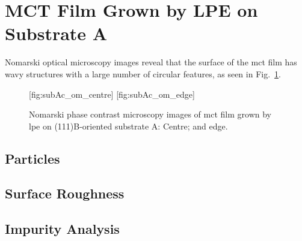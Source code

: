 \clearpage
\section{MCT Film Grown by LPE on Substrate A}\label{sec:subAc}

Nomarski optical microscopy images reveal that the surface of the \ac{mct} film has wavy structures with a large number of circular features, as seen in Fig.~\ref{fig:subAc_om}.

\begin{figure}[htbp]
    \centering
    [fig:subAc_om_centre]
    \hfill
    [fig:subAc_om_edge]
    \caption[Nomarski phase contrast microscopy images of \ac{mct} film grown by \ac{lpe} on substrate A.]{Nomarski phase contrast microscopy images of \ac{mct} film grown by \ac{lpe} on (111)B-oriented substrate A:  Centre; and  edge.}
    \label{fig:subAc_om}
\end{figure}

\subsection{Particles}

\subsection{Surface Roughness}

\subsection{Impurity Analysis}

